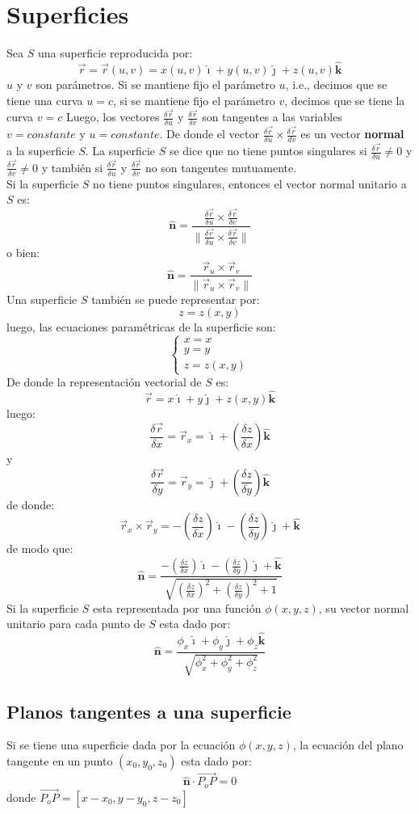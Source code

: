 \documentclass[a4paper]{article}
\newcommand{\ihat}{\boldsymbol{\hat{\imath}}}
\newcommand{\jhat}{\boldsymbol{\hat{\jmath}}}
\newcommand{\khat}{\boldsymbol{\hat{\bm{k}}}}
\newcommand{\abs}[1]{\lVert #1 \rVert}
\begin{document}
\section{Superficies}
Sea $S$ una superficie reproducida por:
\[\vec{r}=\vec{r}(u,v)=x(u,v)\ihat+y(u,v)\jhat+z(u,v)\khat\]
$u$ y $v$ son parámetros.
Si se mantiene fijo el parámetro $u$, i.e., decimos que se tiene una curva $u=c$,
 si se mantiene fijo el parámetro $v$, decimos que se tiene la curva $v=c$
Luego, los vectores $\frac{\delta\vec{r}}{\delta u}$ y $\frac{\delta\vec{r}}{\delta v}$ son tangentes
a las variables $v=constante$ y $u=constante$.
De donde el vector $\frac{\delta\vec{r}}{\delta u}\times\frac{\delta\vec{r}}{dv}$ es un vector \textbf{normal} a la superficie $S$. La superficie $S$ se dice que no tiene puntos singulares si $\frac{\delta\vec{r}}{\delta u}\neq 0$ y $\frac{\delta\vec{r}}{\delta v}\neq 0$ y también si
$\frac{\delta\vec{r}}{\delta u}$ y $\frac{\delta\vec{r}}{\delta v}$ no son tangentes mutuamente.\\
Si la superficie $S$ no tiene puntos singulares, entonces el vector normal unitario
a $S$ es:
\[\mathbf{\hat{n}}=\frac{\frac{\delta\vec{r}}{\delta u}\times\frac{\delta\vec{r}}{\delta v}}{\abs{\frac{\delta\vec{r}}{\delta u}\times\frac{\delta\vec{r}}{\delta v}}}\]
o bien:
\[
\mathbf{\hat{n}}=\frac{\vec{r}_u\times\vec{r}_v}{\abs{\vec{r}_u\times\vec{r}_v}}
\]
Una superficie $S$ también se puede representar por:
\[z=z(x,y)\]
luego, las ecuaciones paramétricas de la superficie son:
\[\begin{cases}
x=x\\
y=y\\
z=z(x,y)
\end{cases}\] 
De donde la representación vectorial de $S$ es:
\[\vec{r}=x\ihat+y\jhat+z(x,y)\khat\]
luego:
\[\frac{\delta\vec{r}}{\delta x}=\vec{r}_x=\ihat+(\frac{\delta z}{\delta x})\khat\]
y
\[\frac{\delta\vec{r}}{\delta y}=\vec{r}_y=\jhat+(\frac{\delta z}{\delta y})\khat\]
de donde:
\[\vec{r}_x\times\vec{r}_y=-(\frac{\delta z}{\delta x})\ihat-(\frac{\delta z}{\delta y})\jhat+\khat\]
de modo que:
\[\mathbf{\hat{n}}=\frac{-(\frac{\delta z}{\delta x})\ihat-(\frac{\delta z}{\delta y})\jhat+\khat}{\sqrt{(\frac{\delta z}{\delta x})^2+(\frac{\delta z}{\delta y})^2+1}}\]
Si la superficie $S$ esta representada por una función $\phi(x,y,z)$, su vector normal unitario para cada punto de $S$ esta dado por:
\[\mathbf{\hat{n}}=\frac{\phi_x\ihat+\phi_y\jhat+\phi_z\khat}{\sqrt{\phi_x^2+\phi_y^2+\phi_z^2}}\]
\subsection{Planos tangentes a una superficie}
Si se tiene una superficie dada por la ecuación $\phi(x,y,z)$, la ecuación del plano tangente en un punto $(x_0,y_0,z_0)$ esta dado por:
\[\mathbf{\hat{n}}\cdot\overrightarrow{P_oP}=0\]
donde $\overrightarrow{P_oP}=[x-x_0,y-y_0,z-z_0]$ 
\end{document}
